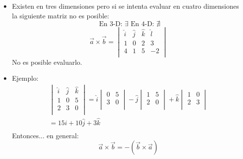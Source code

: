 \begin{itemize}
    \item Existen en tres dimensiones pero si se intenta evaluar en cuatro dimensiones la siguiente matriz no es posible:
    \[
        \text{  En 3-D: } \exists \text{  En 4-D:  } \nexists 
    \]
        \[
           \vec{a}\times \vec{b} = \begin{vmatrix}
              \hat{i} & \hat{j} & \hat{k} & \hat{l} \\ 
              1 & 0 & 2 & 3 \\ 
              4 & 1 & 5 & -2 \\ 
          \end{vmatrix}
        \]
        No es posible evaluarlo.
    
    \item Ejemplo:
          \begin{align*}
            \begin{vmatrix}
                \hat{i} & \hat{j} & \hat{k} \\ 
                1 & 0 & 5 \\ 
                2 & 3 & 0 \\ 
            \end{vmatrix} = \hat{i}\begin{vmatrix}
                0 & 5 \\ 
                3 & 0 \\ 
            \end{vmatrix} - \hat{j}\begin{vmatrix}
                1 & 5 \\ 
                2 & 0 \\ 
            \end{vmatrix} + \hat{k}\begin{vmatrix}
                1 & 0 \\ 
                2 & 3 \\ 
            \end{vmatrix} \\ 
            = 15\hat{i}+10\hat{j}+3\hat{k}\\ 
          \end{align*}
          Entonces... en general: 
          \[
                \vec{a}\times \vec{b} = -(\vec{b}\times \vec{a})
          \]
\end{itemize}




















